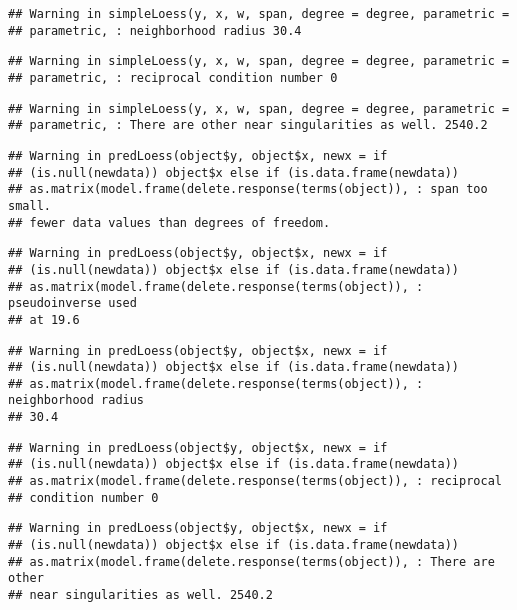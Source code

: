\documentclass[]{article}
\begin{document}
\begin{verbatim}
## Warning in simpleLoess(y, x, w, span, degree = degree, parametric =
## parametric, : neighborhood radius 30.4
\end{verbatim}

\begin{verbatim}
## Warning in simpleLoess(y, x, w, span, degree = degree, parametric =
## parametric, : reciprocal condition number 0
\end{verbatim}

\begin{verbatim}
## Warning in simpleLoess(y, x, w, span, degree = degree, parametric =
## parametric, : There are other near singularities as well. 2540.2
\end{verbatim}

\begin{verbatim}
## Warning in predLoess(object$y, object$x, newx = if
## (is.null(newdata)) object$x else if (is.data.frame(newdata))
## as.matrix(model.frame(delete.response(terms(object)), : span too small.
## fewer data values than degrees of freedom.
\end{verbatim}

\begin{verbatim}
## Warning in predLoess(object$y, object$x, newx = if
## (is.null(newdata)) object$x else if (is.data.frame(newdata))
## as.matrix(model.frame(delete.response(terms(object)), : pseudoinverse used
## at 19.6
\end{verbatim}

\begin{verbatim}
## Warning in predLoess(object$y, object$x, newx = if
## (is.null(newdata)) object$x else if (is.data.frame(newdata))
## as.matrix(model.frame(delete.response(terms(object)), : neighborhood radius
## 30.4
\end{verbatim}

\begin{verbatim}
## Warning in predLoess(object$y, object$x, newx = if
## (is.null(newdata)) object$x else if (is.data.frame(newdata))
## as.matrix(model.frame(delete.response(terms(object)), : reciprocal
## condition number 0
\end{verbatim}

\begin{verbatim}
## Warning in predLoess(object$y, object$x, newx = if
## (is.null(newdata)) object$x else if (is.data.frame(newdata))
## as.matrix(model.frame(delete.response(terms(object)), : There are other
## near singularities as well. 2540.2
\end{verbatim}
\end{document}
